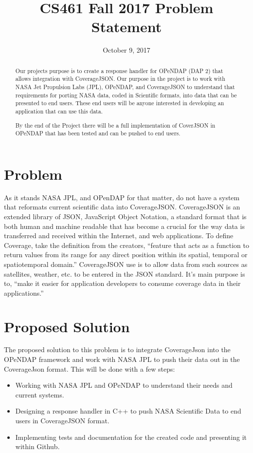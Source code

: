 \documentclass[letterpaper,10pt,draftclsnofoot,onecolumn]{IEEEtran}
\title{CS461 Fall 2017 Problem Statement}
\date{October 9, 2017}
\author{\authors}
\begin{document}
\begin{titlepage}
\maketitle
\begin{abstract}
\centering
Our projects purpose is to create a response handler for OPeNDAP (DAP 2) that allows integration with CoverageJSON. Our purpose in the project is to work with NASA Jet Propulsion Labs (JPL), OPeNDAP, and CoverageJSON to understand that requirements for porting NASA data, coded in Scientific formats, into data that can be presented to end users. These end users will be anyone interested in developing an application that can use this data. \par
By the end of the Project there will be a full implementation of CoverJSON in OPeNDAP that has been tested and can be pushed to end users. 
\end{abstract}
\end{titlepage}


\section{Problem}
As it stands NASA JPL, and OPenDAP for that matter, do not have a system that reformats current scientific data into CoverageJSON. CoverageJSON is an extended library of JSON, JavaScript Object Notation, a standard format that is both human and machine readable that has become a crucial for the way data is transferred and received within the Internet, and web applications. To define Coverage, take the definition from the creators, “feature that acts as a function to return values from its range for any direct position within its spatial, temporal or spatiotemporal domain.”  CoverageJSON use is to allow data from such sources as satellites, weather, etc. to be entered in the JSON standard. It’s main purpose is to, “make it easier for application developers to consume coverage data in their applications.”

\section{Proposed Solution}
The proposed solution to this problem is to integrate CoverageJson into the OPeNDAP framework and work with NASA JPL to push their data out in the CoverageJson format. This will be done with a few steps: \par
\begin{itemize}
  \item Working with NASA JPL and OPeNDAP to understand their needs and current systems.
  \item Designing a response handler in C++ to push NASA Scientific Data to end users in CoverageJSON format. 
  \item Implementing tests and documentation for the created code and presenting it within Github. 
\end{itemize}
\end{document}
